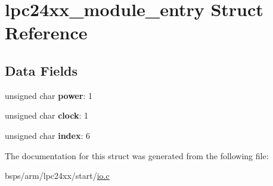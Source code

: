 \hypertarget{structlpc24xx__module__entry}{}\section{lpc24xx\+\_\+module\+\_\+entry Struct Reference}
\label{structlpc24xx__module__entry}
\subsection*{Data Fields}
\begin{DoxyCompactItemize}
\item 
\mbox{\label{structlpc24xx__module__entry_ae34963a58216a2259b24468933e701ff}} 
unsigned char {\bfseries power}\+: 1
\item 
\mbox{\label{structlpc24xx__module__entry_a9a03a446492cb2cf0e0f0a7162ab7a7a}} 
unsigned char {\bfseries clock}\+: 1
\item 
\mbox{\label{structlpc24xx__module__entry_a5a8a06dcae0fe0af38b9a07c08185e59}} 
unsigned char {\bfseries index}\+: 6
\end{DoxyCompactItemize}


The documentation for this struct was generated from the following file\+:\begin{DoxyCompactItemize}
\item 
bsps/arm/lpc24xx/start/\mbox{\hyperlink{bsps_2arm_2lpc24xx_2start_2io_8c}{io.\+c}}\end{DoxyCompactItemize}
